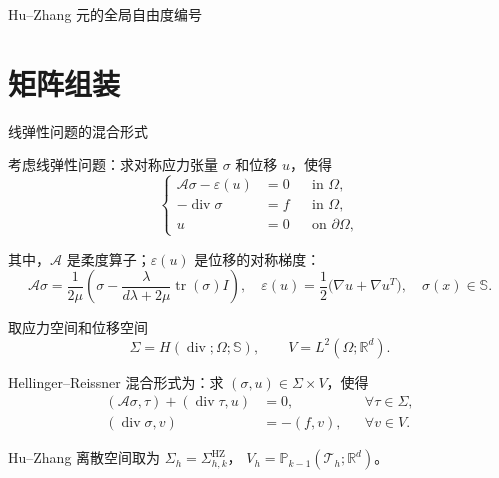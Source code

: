 \documentclass[aspectratio=169,professionalfonts]{ctexbeamer}
\begin{document}
\begin{frame}{Hu--Zhang 元的全局自由度编号}

\end{frame}

\section{矩阵组装}

\begin{frame}{线弹性问题的混合形式}
\begingroup
\small
\setlength{\abovedisplayskip}{4pt}
\setlength{\belowdisplayskip}{4pt}

考虑线弹性问题：求对称应力张量 $\sigma$ 和位移 $u$，使得
\[
\left\{
\begin{aligned}
\mathcal A\sigma-\varepsilon(u)&=0
&&\text{in }\Omega,\\
-\operatorname{div}\sigma&=f
&&\text{in }\Omega,\\
u&=0
&&\text{on }\partial\Omega,
\end{aligned}
\right.
 \]

其中，$\mathcal A$ 是柔度算子；$\varepsilon(u)$ 是位移的对称梯度：
\[
\mathcal{A} \sigma =
\frac{1}{2\mu}\left(\sigma-\frac{\lambda}{d\lambda+2\mu}
\operatorname{tr}(\sigma)I\right),\quad 
\varepsilon(u)
=
\frac12\bigl(\nabla u+\nabla u^{T}\bigr),
\quad
\sigma(x)\in\mathbb S.
\]

取应力空间和位移空间
\[
\Sigma=H(\operatorname{div};\Omega;\mathbb S),
\qquad
V=L^2(\Omega;\mathbb R^d).
\]

Hellinger--Reissner 混合形式为：求
$(\sigma,u)\in\Sigma\times V$，使得
\[
\begin{aligned}
(\mathcal A\sigma,\tau)
+(\operatorname{div}\tau,u)
&=0,
&&\forall\tau\in\Sigma,\\
(\operatorname{div}\sigma,v)
&=-(f,v),
&&\forall v\in V.
\end{aligned}
\]

Hu--Zhang 离散空间取为
$\Sigma_h=\Sigma_{h,k}^{\mathrm{HZ}}$，
$V_h=\mathbb P_{k-1}(\mathcal T_h;\mathbb R^d)$。
\endgroup
\end{frame}
\end{document}
